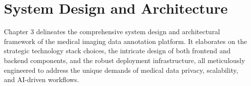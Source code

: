 \chapter{System Design and Architecture}
\label{sec:System Design and Architecture}
\begin{ChapAbstract}
Chapter 3 delineates the comprehensive system design and architectural framework of the medical imaging data annotation platform. It elaborates on the strategic technology stack choices, the intricate design of both frontend and backend components, and the robust deployment infrastructure, all meticulously engineered to address the unique demands of medical data privacy, scalability, and AI-driven workflows.
\end{ChapAbstract}




